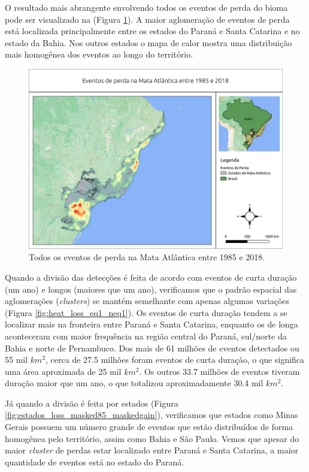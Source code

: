 O resultado mais abrangente envolvendo todos os eventos de perda do bioma pode ser visualizado na (Figura \ref{fig:heat_loss_masked85_maskedgain}). A maior aglomeração de eventos de perda está localizada principalmente entre os estados do Paraná e Santa Catarina e no estado da Bahia. Nos outros estados o mapa de calor mostra uma distribuição mais homogênea dos eventos ao longo do território. 

\begin{figure}[H]
    \centering
    \includegraphics[scale=.5]{images/heatmap_loss_masked85_maskedgain.png}
    \caption{Todos os eventos de perda na Mata Atlântica entre 1985 e 2018.}
    \label{fig:heat_loss_masked85_maskedgain}
\end{figure}

Quando a divisão das detecções é feita de acordo com eventos de curta duração (um ano) e longos (maiores que um ano), verificamos que o padrão espacial das aglomerações (\textit{clusters}) se mantém semelhante com apenas algumas variações (Figura \ref{fig:heat_loss_eq1_neq1}). Os eventos de curta duração tendem a se localizar mais na fronteira entre Paraná e Santa Catarina, enquanto os de longa aconteceram com maior frequência na região central do Paraná, sul/norte da Bahia e norte de Pernambuco. Dos mais de 61 milhões de eventos detectados ou 55 mil $ km^2 $, cerca de 27.5 milhões foram eventos de curta duração, o que significa uma área aproximada de 25 mil $ km^2 $. Os outros 33.7 milhões de eventos tiveram duração maior que um ano, o que totalizou aproximadamente 30.4 mil $ km^2 $.

Já quando a divisão é feita por estados (Figura \ref{fig:estados_loss_masked85_maskedgain}), verificamos que estados como Minas Gerais possuem um número grande de eventos que estão distribuídos de forma homogênea pelo território, assim como Bahia e São Paulo. Vemos que apesar do maior \textit{cluster} de perdas estar localizado entre Paraná e Santa Catarina, a maior quantidade de eventos está no estado do Paraná. 

